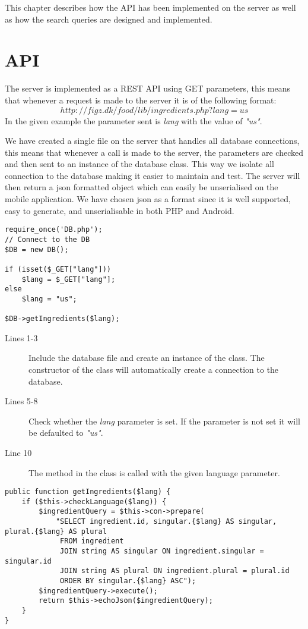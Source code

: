This chapter describes how the API has been implemented on the server as well as how the search queries are designed and implemented.
\section{API}
\label{sec:com}

The server is implemented as a REST API using GET parameters, this means that whenever a request is made to the server it is of the following format: $$http://figz.dk/food/lib/ingredients.php?lang=us$$ In the given example the parameter sent is \textit{lang} with the value of \textit{"us"}.

We have created a single file on the server that handles all database connections, this means that whenever a call is made to the server, the parameters are checked and then sent to an instance of the database class. This way we isolate all connection to the database making it easier to maintain and test. The server will then return a \ac{json} formatted object which can easily be unserialised on the mobile application. We have chosen \ac{json} as a format since it is well supported, easy to generate, and unserialisable in both PHP and Android.

\begin{lstlisting}[language=phpstyle, caption=ingredients.php.]
require_once('DB.php');
// Connect to the DB
$DB = new DB();

if (isset($_GET["lang"]))
	$lang = $_GET["lang"];
else
	$lang = "us";

$DB->getIngredients($lang);
\end{lstlisting}%

\begin{description}
\item[Lines 1-3] Include the database file and create an instance of the  class. The constructor of the  class will automatically create a connection to the database.
\item[Lines 5-8] Check whether the \textit{lang} parameter is set. If the parameter is not set it will be defaulted to \textit{"us"}.
\item[Line 10] The method  in the  class is called with the given language parameter.
\end{description}

\begin{lstlisting}[language=phpstyle, label=lst:getIngredients, caption=getIngredients() method of DB class.]
public function getIngredients($lang) {
    if ($this->checkLanguage($lang)) {
        $ingredientQuery = $this->con->prepare(
            "SELECT ingredient.id, singular.{$lang} AS singular, plural.{$lang} AS plural
             FROM ingredient
             JOIN string AS singular ON ingredient.singular = singular.id
             JOIN string AS plural ON ingredient.plural = plural.id
             ORDER BY singular.{$lang} ASC");
        $ingredientQuery->execute();
        return $this->echoJson($ingredientQuery);
    }
}
\end{lstlisting}%

